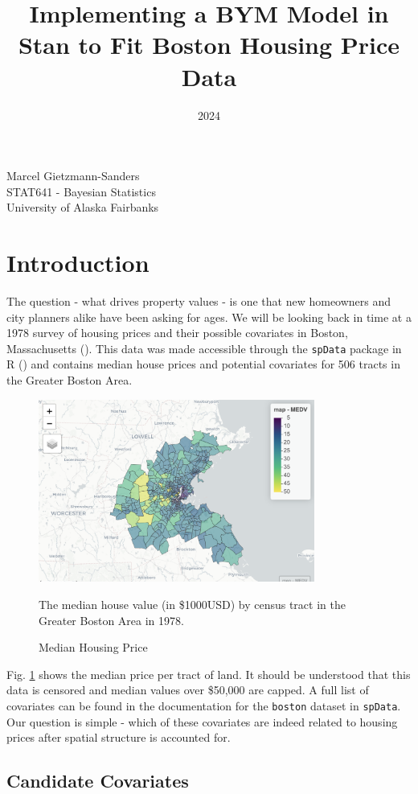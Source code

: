 \documentclass[11pt]{article}
\title{Implementing a BYM Model in Stan to Fit Boston Housing Price Data}
\date{2024}
\makeatletter
\newcommand{\code}[1]{\colorbox{light-gray}{\texttt{#1}}}
\renewcommand{\maketitle}{
\begin{center}

\pagestyle{empty}

{\Large \bf \@title\par}
\vspace{1cm}

{\LARGE Marcel Gietzmann-Sanders}\\[1cm]

STAT641 - Bayesian Statistics \\
University of Alaska Fairbanks


\end{center}
}\makeatother
\makeatother
\begin{document}
\maketitle
\tableofcontents
\newpage 

\section{Introduction}

The question - what drives property values - is one that new homeowners and city planners alike have been asking for ages. We will be looking back in time at a 1978 survey of housing prices and their possible covariates in Boston, Massachusetts (\cite{origin}). This data was made accessible through the \code{spData} package in R (\cite{spdata}) and contains median house prices and potential covariates for 506 tracts in the Greater Boston Area. 

\begin{figure}[h!] 
  \centering
  \includegraphics[height=60mm]{prices.png}
  \caption{Median Housing Price}
  \medskip
	\small
	The median house value (in \$1000USD) by census tract in the Greater Boston Area in 1978.
  \label{fig:prices}
\end{figure}

Fig. \ref{fig:prices} shows the median price per tract of land. It should be understood that this data is censored and median values over \$50,000 are capped. A full list of covariates can be found in the documentation for the \code{boston} dataset in \code{spData}. Our question is simple - which of these covariates are indeed related to housing prices after spatial structure is accounted for. 

\newpage

\subsection{Candidate Covariates}
\end{document}
